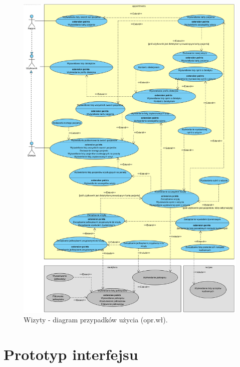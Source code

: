 \begin{minipage}{\textwidth}
    \begin{figure}[H]
        \centering\includegraphics[scale=0.55]{../uml/use_case_diagrams/appointments.png}
        \caption{Wizyty - diagram przypadków użycia (opr.wł).}\label{rysunek:use-case-diagram-appointments}
    \end{figure}
\end{minipage}

\section{Prototyp interfejsu}\label{sec:mockups}

